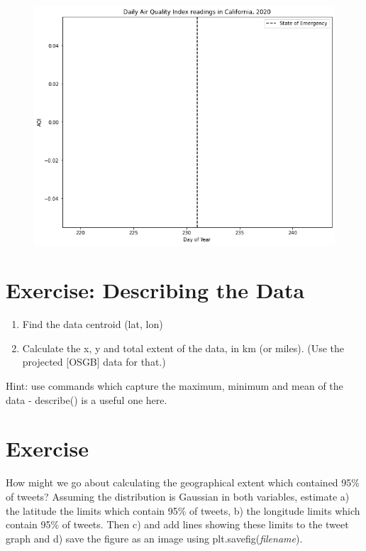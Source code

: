 \documentclass[
  letterpaper,
  DIV=11,
  numbers=noendperiod]{scrreprt}
\begin{document}
\begin{figure}[H]

{\centering \includegraphics{notebooks/W03. Spatial Data_files/figure-pdf/cell-15-output-2.png}

}

\end{figure}

\hypertarget{exercise-describing-the-data}{%
\section{Exercise: Describing the
Data}\label{exercise-describing-the-data}}

\begin{enumerate}
\def\labelenumi{\arabic{enumi})}
\item
  Find the data centroid (lat, lon)
\item
  Calculate the x, y and total extent of the data, in km (or miles).
  (Use the projected {[}OSGB{]} data for that.)
\end{enumerate}

Hint: use commands which capture the maximum, minimum and mean of the
data - describe() is a useful one here.

\hypertarget{exercise-7}{%
\section{Exercise}\label{exercise-7}}

How might we go about calculating the geographical extent which
contained 95\% of tweets? Assuming the distribution is Gaussian in both
variables, estimate a) the latitude the limits which contain 95\% of
tweets, b) the longitude limits which contain 95\% of tweets. Then c)
and add lines showing these limits to the tweet graph and d) save the
figure as an image using plt.savefig(\emph{filename}).
\end{document}
